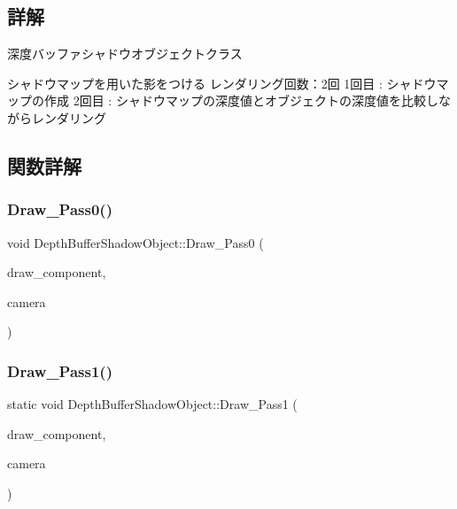\subsection{詳解}
深度バッファシャドウオブジェクトクラス 

シャドウマップを用いた影をつける レンダリング回数：2回 1回目 \+: シャドウマップの作成 2回目 \+: シャドウマップの深度値とオブジェクトの深度値を比較しながらレンダリング 

\subsection{関数詳解}
\mbox{\label{class_depth_buffer_shadow_object_a7916c03b90a01c71a9050e721cf6810c}} 
\subsubsection{\texorpdfstring{Draw\+\_\+\+Pass0()}{Draw\_Pass0()}}
{\footnotesize\ttfamily void Depth\+Buffer\+Shadow\+Object\+::\+Draw\+\_\+\+Pass0 (\begin{DoxyParamCaption}\item[{\mbox{\hyperlink{class_draw_component}{Draw\+Component}} $\ast$}]{draw\+\_\+component,  }\item[{\mbox{\hyperlink{class_camera}{Camera}} $\ast$}]{camera }\end{DoxyParamCaption})\hspace{0.3cm}{\ttfamily [static]}}

\mbox{\label{class_depth_buffer_shadow_object_a4bf8a72a447aa6ff150f3fef630ab448}} 
\subsubsection{\texorpdfstring{Draw\+\_\+\+Pass1()}{Draw\_Pass1()}}
{\footnotesize\ttfamily static void Depth\+Buffer\+Shadow\+Object\+::\+Draw\+\_\+\+Pass1 (\begin{DoxyParamCaption}\item[{\mbox{\hyperlink{class_draw_component}{Draw\+Component}} $\ast$}]{draw\+\_\+component,  }\item[{\mbox{\hyperlink{class_camera}{Camera}} $\ast$}]{camera }\end{DoxyParamCaption})\hspace{0.3cm}{\ttfamily [static]}}

